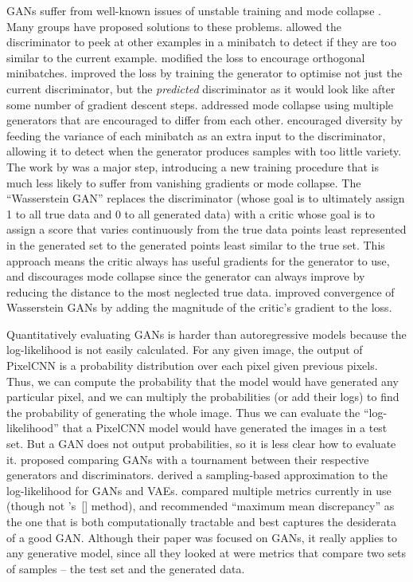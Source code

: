 \documentclass[11pt, a4paper, openany]{book}
\newcommand{\nquote}[1]{``{#1}''}
\newcommand\cites[1]{\citeauthor{#1}'s\ [\citeyear{#1}]}
\begin{document}
GANs suffer from well-known issues of unstable training and mode collapse \citep{gantechniques}. Many groups have proposed solutions to these problems. \citet{gantechniques} allowed the discriminator to peek at other examples in a minibatch to detect if they are too similar to the current example. \citet{energygan} modified the loss to encourage orthogonal minibatches. \citet{unrolledgan} improved the loss by training the generator to optimise not just the current discriminator, but the \emph{predicted} discriminator as it would look like after some number of gradient descent steps. \citet{multiagentgan} addressed mode collapse using multiple generators that are encouraged to differ from each other. \citet{progressivegrowing} encouraged diversity by feeding the variance of each minibatch as an extra input to the discriminator, allowing it to detect when the generator produces samples with too little variety. The work by \citet{wgan} was a major step, introducing a new training procedure that is much less likely to suffer from vanishing gradients or mode collapse. The \nquote{Wasserstein GAN} replaces the discriminator (whose goal is to ultimately assign 1 to all true data and 0 to all generated data) with a critic whose goal is to assign a score that varies continuously from the true data points least represented in the generated set to the generated points least similar to the true set. This approach means the critic always has useful gradients for the generator to use, and discourages mode collapse since the generator can always improve by reducing the distance to the most neglected true data. \citet{improvedwgans} improved convergence of Wasserstein GANs by adding the magnitude of the critic's gradient to the loss.

Quantitatively evaluating GANs is harder than autoregressive models because the log-likelihood is not easily calculated. For any given image, the output of PixelCNN is a probability distribution over each pixel given previous pixels. Thus, we can compute the probability that the model would have generated any particular pixel, and we can multiply the probabilities (or add their logs) to find the probability of generating the whole image. Thus we can evaluate the \nquote{log-likelihood} that a PixelCNN model would have generated the images in a test set. But a GAN does not output probabilities, so it is less clear how to evaluate it. \citet{gantournament} proposed comparing GANs with a tournament between their respective generators and discriminators. \citet{likelihoodestimation} derived a sampling-based approximation to the log-likelihood for GANs and VAEs. \citet{ganmetrics} compared multiple metrics currently in use (though not \cites{likelihoodestimation} method), and recommended \nquote{maximum mean discrepancy} \citep{mmd} as the one that is both computationally tractable and best captures the desiderata of a good GAN. Although their paper was focused on GANs, it really applies to any generative model, since all they looked at were metrics that compare two sets of samples -- the test set and the generated data.
\end{document}
